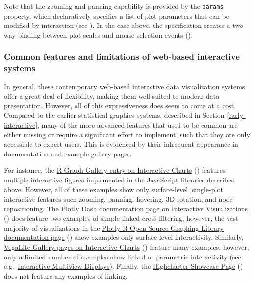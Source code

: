\documentclass[
]{book}
\begin{document}
Note that the zooming and panning capability is provided by the \texttt{params} property, which declaratively specifies a list of plot parameters that can be modified by interaction (see ). In the case above, the specification creates a two-way binding between plot scales and mouse selection events ().

\subsubsection{Common features and limitations of web-based interactive systems}\label{common-features-and-limitations-of-web-based-interactive-systems}

In general, these contemporary web-based interactive data visualization systems offer a great deal of flexibility, making them well-suited to modern data presentation. However, all of this expressiveness does seem to come at a cost. Compared to the earlier statistical graphics systems, described in Section \ref{early-interactive}, many of the more advanced features that used to be common are either missing or require a significant effort to implement, such that they are only accessible to expert users. This is evidenced by their infrequent appearance in documentation and example gallery pages.

For instance, the \href{https://r-graph-gallery.com/interactive-charts.html}{R Graph Gallery entry on Interactive Charts} () features multiple interactive figures implemented in the JavaScript libraries described above. However, all of these examples show only surface-level, single-plot interactive features such zooming, panning, hovering, 3D rotation, and node repositioning. The \href{https://dash.plotly.com/interactive-graphing}{Plotly Dash documentation page on Interactive Visualizations} () does feature two examples of simple linked cross-filtering, however, the vast majority of visualizations in the \href{https://plotly.com/r/}{Plotly R Open Source Graphing Library documentation page} () show examples only surface-level interactivity. Similarly, \href{https://vega.github.io/vega-lite/examples/\#interactive-charts}{VegaLite Gallery pages on Interactive Charts} () feature many examples, however, only a limited number of examples show linked or parametric interactivity (see e.g.~\href{https://vega.github.io/vega-lite/examples/\#interactive-multi-view-displays}{Interactive Multiview Displays}). Finally, the \href{https://jkunst.com/highcharter/articles/showcase.html}{Highcharter Showcase Page} () does not feature any examples of linking.
\end{document}

